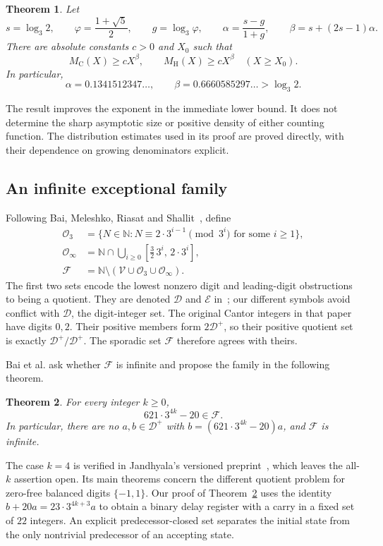 \documentclass[11pt]{article}
\newtheorem{theorem}{Theorem}[section]
\theoremstyle{remark}
\newcommand{\D}{\mathcal D}
\newcommand{\N}{\mathbb N}
\newcommand{\MC}{M_{\mathrm C}}
\newcommand{\MH}{M_{\mathrm H}}
\newcommand{\Obloc}{\mathcal O_3}
\newcommand{\Obreal}{\mathcal O_\infty}
\newcommand{\F}{\mathcal F}
\begin{document}
\begin{theorem}\label{thm:power}
Let
\[
 s=\log_3 2,\qquad \varphi=\frac{1+\sqrt5}{2},\qquad
 g=\log_3\varphi,\qquad
 \alpha=\frac{s-g}{1+g},\qquad
 \beta=s+(2s-1)\alpha.
\]
There are absolute constants $c>0$ and $X_0$ such that
\[
 \MC(X)\ge cX^\beta,\qquad \MH(X)\ge cX^\beta
 \quad (X\ge X_0).
\]
In particular,
\[
 \alpha=0.1341512347\ldots,
 \qquad \beta=0.6660585297\ldots>\log_3 2.
\]
\end{theorem}

The result improves the exponent in the immediate lower bound. It does
not determine the sharp asymptotic size or positive density of either
counting function. The distribution estimates used in its proof are
proved directly, with their dependence on growing denominators explicit.

\subsection{An infinite exceptional family}

Following Bai, Meleshko, Riasat and Shallit~\cite[\S1.4]{BMRS}, define
\begin{align*}
 \Obloc&=\{N\in\N:N\equiv2\cdot3^{i-1}\pmod{3^i}
                             \text{ for some }i\ge1\},\\
 \Obreal&=\N\cap\bigcup_{i\ge0}
                    [\tfrac32\,3^i,\,2\cdot3^i],\\
 \F&=\N\setminus(\mathcal V\cup\Obloc\cup\Obreal).
\end{align*}
The first two sets encode the lowest nonzero digit and leading-digit
obstructions to being a quotient. They are denoted $\mathcal D$ and
$\mathcal E$ in~\cite{BMRS}; our different symbols avoid conflict with
$\D$, the digit-integer set. The original Cantor integers in that paper
have digits $0,2$. Their positive members form $2\D^+$, so their
positive quotient set is exactly $\D^+/\D^+$. The sporadic set $\F$
therefore agrees with theirs.

Bai et al. ask whether $\F$ is infinite and propose the family in the
following theorem.

\begin{theorem}\label{thm:family}
For every integer $k\ge0$,
\[
                  621\cdot3^{4k}-20\in\F.
\]
In particular, there are no $a,b\in\D^+$ with
$b=(621\cdot3^{4k}-20)a$, and $\F$ is infinite.
\end{theorem}

The case $k=4$ is verified in Jandhyala's versioned
preprint~\cite[\S6]{Jandhyala}, which leaves the all-$k$ assertion open.
Its main theorems concern the different quotient problem for zero-free
balanced digits $\{-1,1\}$. Our proof of Theorem~\ref{thm:family}
uses the identity $b+20a=23\cdot3^{4k+3}a$ to obtain a binary delay
register with a carry in a fixed set of $22$ integers. An explicit
predecessor-closed set separates the initial state from the only
nontrivial predecessor of an accepting state.
\end{document}
